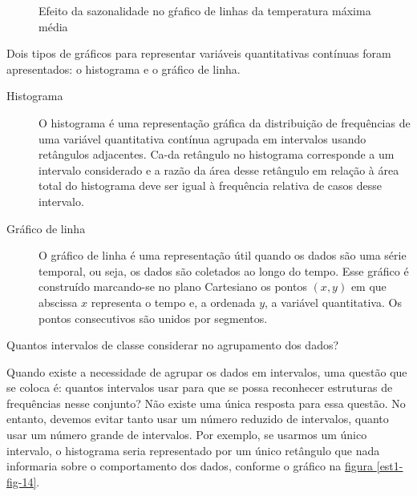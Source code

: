 {\begin{figure}[H]
\begin{tikzpicture} [yscale=0.5, scale=1.1, every node/.style={scale=1.2}]
\end{tikzpicture}
\caption{Efeito da sazonalidade no gŕafico de linhas da temperatura máxima média}
\label{est1-fig-13}

\end{figure}
\newpage

\label{est1-org-2}
Dois tipos de gráficos para representar variáveis quantitativas contínuas foram apresentados: o histograma e o gráfico de linha.
\begin{description}
\item[{Histograma}] \leavevmode{}\label{est1-def-14}
O histograma é uma representação gráfica da distribuição de frequências de uma variável quantitativa contínua agrupada em intervalos usando retângulos adjacentes. Ca-da retângulo no histograma corresponde a um intervalo considerado e a razão da área desse retângulo em relação à área total do histograma deve ser igual à frequência relativa de casos desse intervalo.

\end{description}
\begin{description}
\item[{Gráfico de linha}] \leavevmode{}\label{est1-def-15}
O gráfico de linha é uma representação útil quando os dados são uma série temporal, ou seja, os dados são coletados ao longo do tempo. Esse gráfico é construído marcando-se no plano Cartesiano os pontos \((x,y)\) em que abscissa \(x\) representa o tempo e, a ordenada \(y\), a variável quantitativa. Os pontos consecutivos são unidos por segmentos.

\end{description}

Quantos intervalos de classe considerar no agrupamento dos dados?

Quando existe a necessidade de agrupar os dados em intervalos, uma questão que se coloca é: quantos intervalos usar para que se possa reconhecer estruturas de frequências nesse conjunto? Não existe uma única resposta para essa questão. No entanto, devemos evitar tanto usar um número reduzido de intervalos, quanto usar um número grande de intervalos. Por exemplo, se usarmos um único intervalo, o histograma seria representado por um único retângulo que nada informaria sobre o comportamento dos dados, conforme o gráfico na \hyperref[est1-fig-15]{figura \ref{est1-fig-14}}.

\begin{figure}[H]
\centering
\capstart


\end{figure}}
